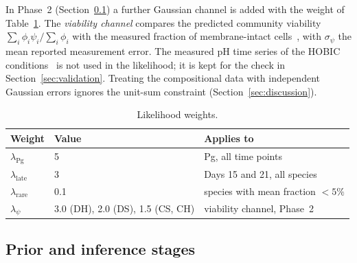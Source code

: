 \documentclass[pdflatex,sn-mathphys-ay,lineno]{sn-jnl}%
\begin{document}
In Phase~2 (Section~\ref{sec:prior}) a further Gaussian channel is added with the weight of Table~\ref{tab:weights}.
The \emph{viability channel} compares the predicted community viability $\sum_i\phi_i\psi_i/\sum_i\phi_i$ with the measured fraction of membrane-intact cells~\citep{heine2025influence}, with $\sigma_\psi$ the mean reported measurement error.
The measured pH time series of the HOBIC conditions~\citep{heine2025influence} is not used in the likelihood; it is kept for the check in Section~\ref{sec:validation}.
Treating the compositional data with independent Gaussian errors ignores the unit-sum constraint (Section~\ref{sec:discussion}).

\begin{table}[htbp]\centering\small
\begin{tabular}{@{}lll@{}}\toprule
Weight & Value & Applies to\\\midrule
$\lambda_{\mathrm{Pg}}$ & 5 & Pg, all time points\\
$\lambda_{\mathrm{late}}$ & 3 & Days 15 and 21, all species\\
$\lambda_{\mathrm{rare}}$ & 0.1 & species with mean fraction $<5\%$\\
$\lambda_{\psi}$ & 3.0 (DH), 2.0 (DS), 1.5 (CS, CH) & viability channel, Phase~2\\\bottomrule
\end{tabular}
\caption{Likelihood weights.}
\label{tab:weights}
\end{table}

\subsection{Prior and inference stages}
\label{sec:prior}
\end{document}

